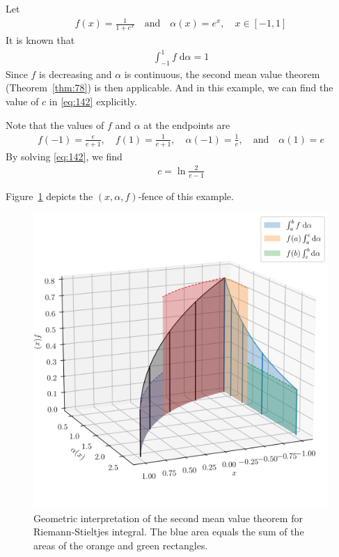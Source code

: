 \documentclass[thmcnt=section, 12pt]{my-elegantbook}
\begin{document}
\begin{example} \label{eg:11}
    Let
    \begin{align*}
        f(x) = \frac{1}{1 + e^x}
        \quad \text{and} \quad
        \alpha(x) = e^x,
        \quad
        x \in [-1, 1]
    \end{align*}
    It is known that
    \begin{align*}
        \int_{-1}^1 f \; \mathrm{d} \alpha = 1
    \end{align*}
    Since $f$ is decreasing and $\alpha$ is continuous,
    the second mean value theorem (Theorem~\ref{thm:78})
    is then applicable.
    And in this example, we can find the value of $c$
    in \eqref{eq:142} explicitly.

    Note that the values of $f$ and $\alpha$ at the endpoints are
    \begin{align*}
        f(-1) = \frac{e}{e + 1},
        \quad
        f(1) = \frac{1}{e + 1},
        \quad
        \alpha(-1) = \frac{1}{e},
        \quad \text{and} \quad
        \alpha(1) = e
    \end{align*}
    By solving \eqref{eq:142}, we find
    \begin{align*}
        c = \ln \frac{2}{e-1}
    \end{align*}

    Figure~\ref{fig:14} depicts the $(x,\alpha,f)$-fence of this example.

    \begin{figure}[ht]
        \centering
        \includegraphics[scale=0.5]{figures/ma-014.png}
        \caption{
            Geometric interpretation of
            the second mean value theorem
            for Riemann-Stieltjes integral.
            The blue area
            equals the sum of the areas
            of the orange and green rectangles.
        }
        \label{fig:14}
    \end{figure}
\end{example}
\end{document}
